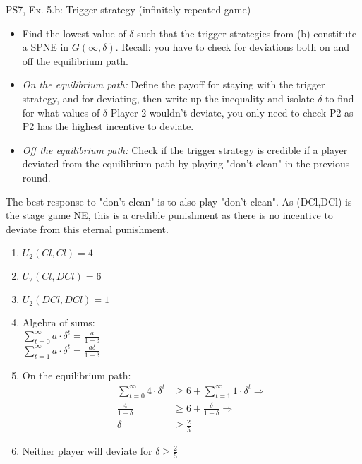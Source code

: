 \begin{frame}{PS7, Ex. 5.b: Trigger strategy (infinitely repeated game)}
    \begin{itemize}
        \item[(b)] Find the lowest value of $\delta$ such that the trigger strategies from (b) constitute a SPNE in $G(\infty,\delta)$. Recall: you have to check for deviations both on and off the equilibrium path.
    \end{itemize}
  \begin{multicols}{2}
    \begin{itemize}
        \item[(Step a)] \textit{On the equilibrium path:} Define the payoff for staying with the trigger strategy, and for deviating, then write up the inequality and isolate $\delta$ to find for what values of $\delta$ Player 2 wouldn't deviate, you only need to check P2 as P2 has the highest incentive to deviate.
        \item[(Step b)] \textit{Off the equilibrium path:} Check if the trigger strategy is credible if a player deviated from the equilibrium path by playing "don't clean" in the previous round.
    \end{itemize}
    The best response to "don't clean" is to also play "don't clean". As (DCl,DCl) is the stage game NE, this is a credible punishment as there is no incentive to deviate from this eternal punishment.
    \vfill\null\columnbreak
    \begin{enumerate}
        \item $U_2(Cl,Cl) = 4$
        \item $U_2(Cl,DCl) = 6$
        \item $U_2(DCl,DCl) = 1$
        \item Algebra of sums:\\
        $\sum_{t=0}^{\infty} a\cdot\delta^{t} = \frac{a}{1-\delta}$ \\ $\sum_{t=1}^{\infty} a\cdot\delta^{t} = \frac{a\delta}{1-\delta}$
        \item On the equilibrium path:
        \begin{align*}
            \sum_{t=0}^{\infty} 4\cdot\delta^{t}&\geq6 + \sum_{t=1}^{\infty} 1\cdot\delta^{t}\Rightarrow\\
            \frac{4}{1-\delta} &\geq 6 + \frac{\delta}{1-\delta}\Rightarrow\\
            \delta &\geq \frac{2}{5}
        \end{align*}
        \item Neither player will deviate for $\delta \geq \frac{2}{5}$
    \end{enumerate}
    \vfill\null
  \end{multicols}
\end{frame}


